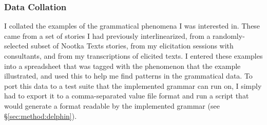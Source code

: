 

\subsubsection{Data Collation} \label{sec:method:collation}

I collated the examples of the grammatical phenomena I was interested in. These came from a set of stories I had previously interlinearized, from a randomly-selected subset of Nootka Texts stories, from my elicitation sessions with consultants, and from my transcriptions of elicited texts. I entered these examples into a spreadsheet that was tagged with the phenomenon that the example illustrated, and used this to help me find patterns in the grammatical data. To port this data to a test suite that the implemented grammar can run on, I simply had to export it to a comma-separated value file format and run a script that would generate a format readable by the implemented grammar (see \S\ref{sec:method:delphin}).

